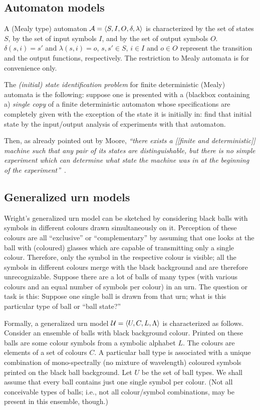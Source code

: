 \subsection{Automaton models}

A (Mealy type) automaton
${\cal A}=\langle S,I,O,\delta ,\lambda \rangle$ is characterized
by the set of states $S$,
by the set of input symbols $I$,
and by the set of output symbols $O$.
$\delta (s,i)=s'$ and
$\lambda (s,i)=o$,
$s,s'\in S$,
$i\in I$
and $o\in O$
represent the transition and the output functions, respectively.
The restriction to Mealy automata is for convenience only.


The {\em (initial) state identification problem}
for finite deterministic (Mealy) automata is the following:
suppose one is presented with a (blackbox containing a) {\em single copy}
of a finite deterministic automaton whose specifications are completely given
with the exception of the state it is initially in: find that initial state by the input/output analysis of experiments with that automaton.

Then, as already pointed out by Moore,
{\em ``there exists a [[finite and deterministic]] machine such that any pair of its states are
distinguishable, but there is no simple experiment which can determine
what state the machine was in at the beginning of the experiment''}~\cite[Theorem~1, p.~138]{e-f-moore}.


\subsection{Generalized urn models}

Wright's generalized urn model can be sketched by considering black balls with symbols in different colours drawn simultaneously on it.
Perception of these colours are all ``exclusive'' or ``complementary'' by assuming that one looks at the ball with (coloured) glasses
which are capable of transmitting only a single colour. Therefore, only the symbol in the respective colour is visible; all the symbols in different colours
merge with the black background and are therefore unrecognizable.
Suppose there are a lot of balls of many types (with various colours and an equal number of symbols per colour)
in an urn. The question or task is this:
Suppose one single ball is drawn from that urn; what is this particular type of ball or ``ball state?''

Formally, a generalized urn model
${\cal U}=\langle U,C,L,\Lambda \rangle $ is
characterized as follows.
Consider an ensemble of balls with black background colour.
Printed on these balls are some colour symbols from a symbolic alphabet $L$.
The colours are elements of a set of colours $C$.
A particular ball type is associated with a unique combination of mono-spectrally
(no mixture of wavelength) coloured symbols
printed on the black ball background.
Let $U$ be the set of ball types.
We shall assume that every ball contains
just one single symbol per colour.
(Not all conceivable types of balls; i.e., not all colour/symbol combinations, may be present in
this ensemble, though.)

